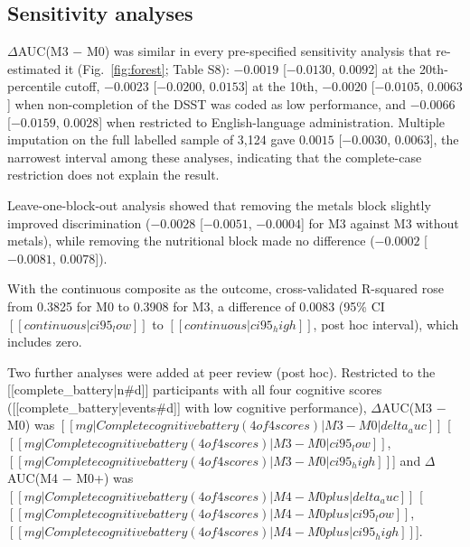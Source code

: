 \documentclass[12pt]{article}
\newcommand{\deltaauc}{$\Delta$AUC}
\begin{document}
\subsection*{Sensitivity analyses}

\deltaauc(M3 $-$ M0) was similar in every pre-specified sensitivity analysis that re-estimated it (Fig.~\ref{fig:forest}; Table S8): $-0.0019$ [$-0.0130$, $0.0092$] at the 20th-percentile cutoff, $-0.0023$ [$-0.0200$, $0.0153$] at the 10th, $-0.0020$ [$-0.0105$, $0.0063$] when non-completion of the DSST was coded as low performance, and $-0.0066$ [$-0.0159$, $0.0028$] when restricted to English-language administration. Multiple imputation on the full labelled sample of 3,124 gave $0.0015$ [$-0.0030$, $0.0063$], the narrowest interval among these analyses, indicating that the complete-case restriction does not explain the result.

Leave-one-block-out analysis showed that removing the metals block slightly improved discrimination ($-0.0028$ [$-0.0051$, $-0.0004$] for M3 against M3 without metals), while removing the nutritional block made no difference ($-0.0002$ [$-0.0081$, $0.0078$]).

With the continuous composite as the outcome, cross-validated R-squared rose from 0.3825 for M0 to 0.3908 for M3, a difference of 0.0083 (95\% CI $[[continuous|ci95_low]]$ to $[[continuous|ci95_high]]$, post hoc interval), which includes zero.

Two further analyses were added at peer review (post hoc). Restricted to the [[complete_battery|n#d]] participants with all four cognitive scores ([[complete_battery|events#d]] with low cognitive performance), \deltaauc(M3 $-$ M0) was $[[mg|Complete cognitive battery (4 of 4 scores)|M3 - M0|delta_auc]]$ [$[[mg|Complete cognitive battery (4 of 4 scores)|M3 - M0|ci95_low]]$, $[[mg|Complete cognitive battery (4 of 4 scores)|M3 - M0|ci95_high]]$] and \deltaauc(M4 $-$ M0+) was $[[mg|Complete cognitive battery (4 of 4 scores)|M4 - M0plus|delta_auc]]$ [$[[mg|Complete cognitive battery (4 of 4 scores)|M4 - M0plus|ci95_low]]$, $[[mg|Complete cognitive battery (4 of 4 scores)|M4 - M0plus|ci95_high]]$].
\end{document}
